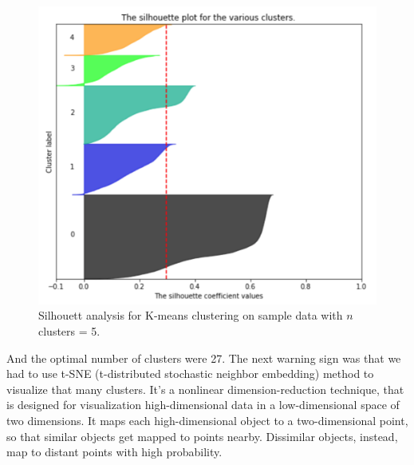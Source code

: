 \begin{figure}[H]\centering
  \includegraphics[width=0.6\linewidth]{plots/cluster5.png}
  \caption{Silhouett analysis for K-means clustering on sample data with $n$ clusters = 5.}
\end{figure}

And the optimal number of clusters were 27. The next warning sign was that we had to use t-SNE (t-distributed stochastic neighbor embedding) method to visualize that many clusters. It's a nonlinear dimension-reduction technique, that is designed for visualization high-dimensional data in a low-dimensional space of two dimensions. It maps each high-dimensional object to a two-dimensional point, so that similar objects get mapped to points nearby. Dissimilar objects, instead, map to distant points with high probability.




        
        
